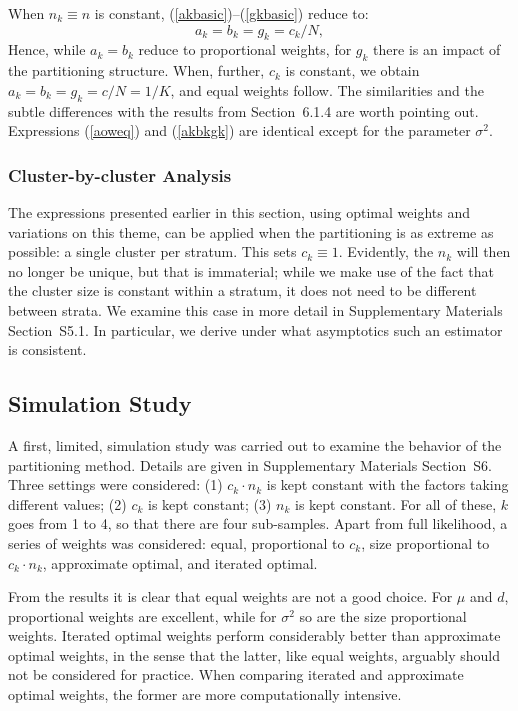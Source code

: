 \documentclass[11pt,a5paper,twoside]{book}
\begin{document}
When $n_k\equiv n$ is constant, (\ref{akbasic})--(\ref{gkbasic}) reduce to:
\begin{equation}
\label{akbkgk}
a_k=b_k=g_k={c_k}/{N},
\end{equation}
Hence, while $a_k=b_k$ reduce to proportional weights,  for $g_k$ there is an impact of the partitioning structure. 
When, further, $c_k$ is constant, we obtain $a_k=b_k=g_k=c/N=1/K$,
and equal weights follow. The similarities and the subtle differences with the results from Section~6.1.4
are worth pointing out. Expressions (\ref{aoweq}) 
and (\ref{akbkgk}) are identical except for the parameter $\sigma^2$.

\subsubsection{Cluster-by-cluster Analysis}\label{cbca}

The expressions presented earlier in this section, using optimal weights 
and variations on this theme, can be applied when the partitioning is 
as extreme as possible: a single cluster per stratum. This sets $c_k\equiv 1$. Evidently, the $n_k$ will 
then no longer be unique, but that is immaterial; while we make use of the fact that the cluster size is  constant within a stratum, it does not need to be different 
between  strata. We examine this case in more detail in Supplementary Materials Section~S5.1.
In particular, we derive under what asymptotics such an estimator is consistent. 



\subsection{Simulation Study}
\label{simulation}

A first, limited, simulation study was carried out to examine the behavior of the 
partitioning method. Details are given in Supplementary Materials Section~S6.
Three settings were considered: (1) $c_k\cdot n_k$ is kept constant with the factors taking different values; (2) $c_k$ is kept constant; (3) $n_k$ is kept constant. For all of these, $k$ goes from 1 to 4, so that there are four sub-samples. Apart from full likelihood, a series of weights was considered: equal, proportional  to $c_k$, size proportional to $c_k\cdot n_k$, approximate optimal, and iterated optimal.

From the results it is clear that equal weights are not a good choice. For $\mu$ and $d$,  proportional weights are excellent, while for $\sigma^2$ so are the size proportional weights. Iterated optimal weights perform considerably better than approximate optimal weights, in the sense  that the latter, like equal weights, arguably should not be considered  for practice. When comparing iterated and approximate optimal weights, 
the former are more computationally intensive.
\end{document}
